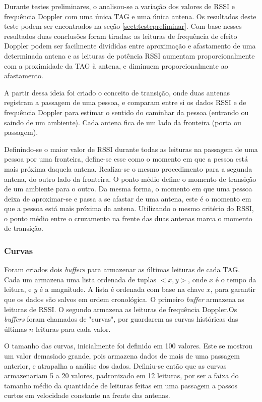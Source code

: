  Durante testes preliminares, o analisou-se a variação dos valores de RSSI e frequência Doppler com uma única TAG e uma única antena. Os resultados deste teste podem ser encontrados na seção \ref{sect:testepreliminar}. Com base nesses resultados duas conclusões foram tiradas: as leituras de frequência de efeito Doppler podem ser facilmente divididas entre aproximação e afastamento de uma determinada antena e as leituras de potência RSSI aumentam proporcionalmente com a proximidade da TAG à antena, e diminuem proporcionalmente ao afastamento.
 
 A partir dessa ideia foi criado o conceito de transição, onde duas antenas registram a passagem de uma pessoa, e comparam entre si os dados RSSI e de frequência Doppler para estimar o sentido do caminhar da pessoa (entrando ou saindo de um ambiente). Cada antena fica de um lado da fronteira (porta ou passagem).
 
 Definindo-se o maior valor de RSSI durante todas as leituras na passagem de uma pessoa por uma fronteira, define-se esse como o momento em que a pessoa está mais próxima daquela antena. Realiza-se o mesmo procedimento para a segunda antena, do outro lado da fronteira. O ponto médio define o momento de transição de um ambiente para o outro. Da mesma forma, o momento em que uma pessoa deixa de aproximar-se e passa a se afastar de uma antena, este é o momento em que a pessoa está mais próxima da antena. Utilizando o mesmo critério do RSSI, o ponto médio entre o cruzamento na frente das duas antenas marca o momento de transição.
 
 \subsubsection{Curvas}
 
 Foram criados dois \textit{buffers} para armazenar as últimas leituras de cada TAG. Cada um armazena uma lista ordenada de tuplas $<x,y>$, onde $x$ é o tempo da leitura, e $y$ é a magnitude. A lista é ordenada com base na chave $x$, para garantir que os dados são salvos em ordem cronológica. O primeiro \textit{buffer} armazena as leituras de RSSI. O segundo armazena as leituras de frequência Doppler.Os \textit{buffers} foram chamados de "curvas", por guardarem as curvas históricas das últimas $n$ leituras para cada valor.
 
 O tamanho das curvas, inicialmente foi definido em 100 valores. Este se mostrou um valor demasiado grande, pois armazena dados de mais de uma passagem anterior, e atrapalha a análise dos dados. Definiu-se então que as curvas armazenariam 5 a 20 valores, padronizado em 12 leituras, por ser a faixa do tamanho médio da quantidade de leituras feitas em uma passagem a passos curtos em velocidade constante na frente das antenas.
 
